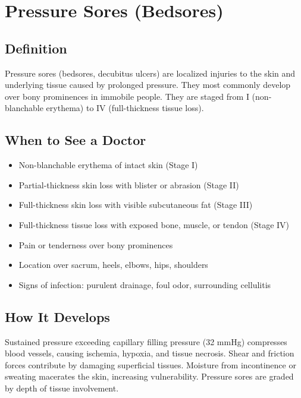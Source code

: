 \chapter{Pressure Sores (Bedsores)}

\section*{Definition}
Pressure sores (bedsores, decubitus ulcers) are localized injuries to the skin and underlying tissue caused by prolonged pressure. They most commonly develop over bony prominences in immobile people. They are staged from I (non-blanchable erythema) to IV (full-thickness tissue loss).

\section*{When to See a Doctor}
\begin{itemize}
\item Non-blanchable erythema of intact skin (Stage I)
\item Partial-thickness skin loss with blister or abrasion (Stage II)
\item Full-thickness skin loss with visible subcutaneous fat (Stage III)
\item Full-thickness tissue loss with exposed bone, muscle, or tendon (Stage IV)
\item Pain or tenderness over bony prominences
\item Location over sacrum, heels, elbows, hips, shoulders
\item Signs of infection: purulent drainage, foul odor, surrounding cellulitis
\end{itemize}

\section*{How It Develops}
Sustained pressure exceeding capillary filling pressure (32 mmHg) compresses blood vessels, causing ischemia, hypoxia, and tissue necrosis. Shear and friction forces contribute by damaging superficial tissues. Moisture from incontinence or sweating macerates the skin, increasing vulnerability. Pressure sores are graded by depth of tissue involvement.


